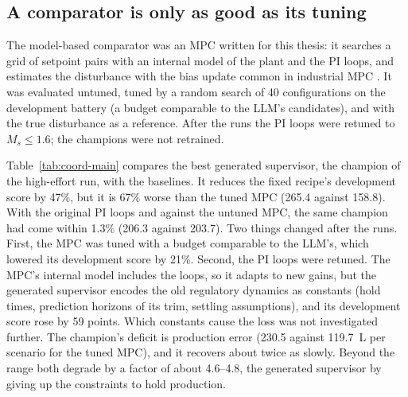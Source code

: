 \subsection{A comparator is only as good as its tuning}
\label{sec:tank-comparator}
The model-based comparator was an MPC written for this thesis: it searches
a grid of setpoint pairs with an internal model of the plant and the PI loops,
and estimates the disturbance with the bias update common in industrial MPC
\cite{qin2003}. It was evaluated untuned, tuned by a random search of 40
configurations on the development battery (a budget comparable to the LLM's
candidates), and with the true disturbance as a reference. After the runs the
PI loops were retuned to $M_s \le 1.6$; the champions were not retrained.

Table~\ref{tab:coord-main} compares the best generated supervisor, the
champion of the high-effort run, with the baselines. It reduces the fixed
recipe's development score by 47\%, but it is 67\% worse than the tuned MPC
(265.4 against 158.8). With the original PI loops and against the untuned
MPC, the same champion had come within 1.3\% (206.3 against 203.7). Two
things changed after the runs. First, the MPC was tuned with a budget
comparable to the LLM's, which lowered its development score by 21\%. Second,
the PI loops were retuned. The MPC's internal model includes the loops, so it
adapts to new gains, but the generated supervisor encodes the old regulatory
dynamics as constants (hold times, prediction horizons of its trim, settling
assumptions), and its development score rose by 59 points. Which constants
cause the loss was not investigated further.
The champion's deficit is production error (230.5 against 119.7~L per
scenario for the tuned MPC), and it recovers about twice as slowly. Beyond
the range both degrade by a factor of about 4.6--4.8, the generated supervisor
by giving up the constraints to hold production.

